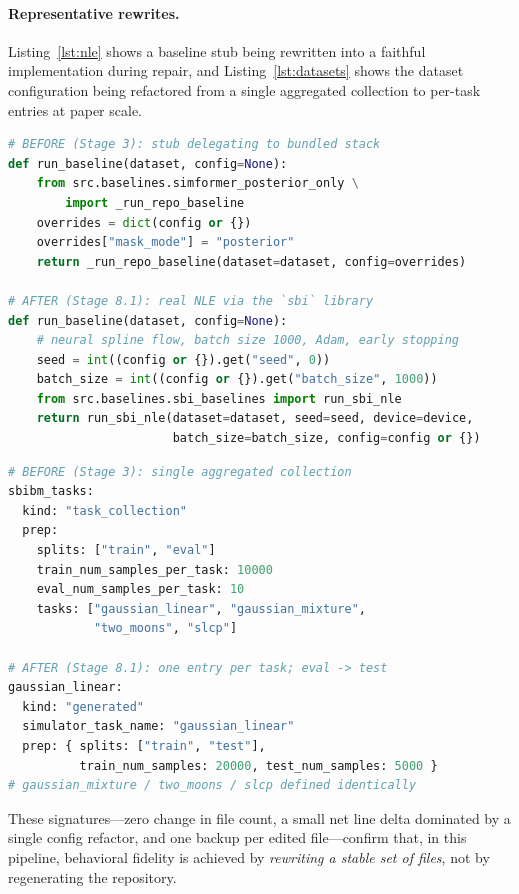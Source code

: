 \documentclass[11pt]{article}
\begin{document}
\paragraph{Representative rewrites.} Listing~\ref{lst:nle} shows a
baseline stub being rewritten into a faithful implementation during
repair, and Listing~\ref{lst:datasets} shows the dataset
configuration being refactored from a single aggregated collection
to per-task entries at paper scale.

\begin{lstlisting}[language=Python,caption={\texttt{src/baselines/nle.py}: stub $\rightarrow$ faithful Neural Likelihood Estimation ($+27/-8$).},label={lst:nle}]
# BEFORE (Stage 3): stub delegating to bundled stack
def run_baseline(dataset, config=None):
    from src.baselines.simformer_posterior_only \
        import _run_repo_baseline
    overrides = dict(config or {})
    overrides["mask_mode"] = "posterior"
    return _run_repo_baseline(dataset=dataset, config=overrides)

# AFTER (Stage 8.1): real NLE via the `sbi` library
def run_baseline(dataset, config=None):
    # neural spline flow, batch size 1000, Adam, early stopping
    seed = int((config or {}).get("seed", 0))
    batch_size = int((config or {}).get("batch_size", 1000))
    from src.baselines.sbi_baselines import run_sbi_nle
    return run_sbi_nle(dataset=dataset, seed=seed, device=device,
                       batch_size=batch_size, config=config or {})
\end{lstlisting}

\begin{lstlisting}[language=Python,caption={\texttt{configs/datasets.yaml}: aggregated collection $\rightarrow$ per-task entries, sizes raised to paper scale ($+129/-53$).},label={lst:datasets}]
# BEFORE (Stage 3): single aggregated collection
sbibm_tasks:
  kind: "task_collection"
  prep:
    splits: ["train", "eval"]
    train_num_samples_per_task: 10000
    eval_num_samples_per_task: 10
    tasks: ["gaussian_linear", "gaussian_mixture",
            "two_moons", "slcp"]

# AFTER (Stage 8.1): one entry per task; eval -> test
gaussian_linear:
  kind: "generated"
  simulator_task_name: "gaussian_linear"
  prep: { splits: ["train", "test"],
          train_num_samples: 20000, test_num_samples: 5000 }
# gaussian_mixture / two_moons / slcp defined identically
\end{lstlisting}

These signatures---zero change in file count, a small net line
delta dominated by a single config refactor, and one backup per
edited file---confirm that, in this pipeline, behavioral fidelity
is achieved by \emph{rewriting a stable set of files}, not by
regenerating the repository.
\end{document}
